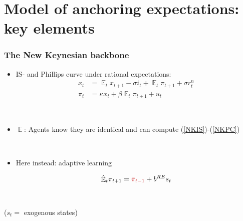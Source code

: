 \documentclass[10pt]{beamer}
\DeclareMathOperator{\E}{\mathbb{E}}
\begin{document}
\section{Model of anchoring expectations: key elements}

\begin{frame}
	\frametitle{The New Keynesian backbone}
	\label{aggregate_LOMS}
\begin{itemize}
\item IS- and Phillips curve under rational expectations:	
 \begin{align}
x_t &=  \E_t x_{t+1} -\sigma i_t + \E_t \pi_{t+1} + \sigma r_t^n   \label{NKIS}  \\
\pi_t &= \kappa x_t +\beta \E_t  \pi_{t+1} + u_t\label{NKPC} 
\end{align}


\

\pause 

\item $\E$: Agents know they are identical and can compute (\ref{NKIS})-(\ref{NKPC})

\

\pause

\item Here instead: adaptive learning 

\begin{equation}
\hat{\E}_t \pi_{t+1} = \textcolor{brownreddark}{\bar{\pi}_{t-1}} + b^{RE}s_t 
\end{equation}
\end{itemize}

\

($s_t = $ exogenous states)

\end{frame}
\end{document}
